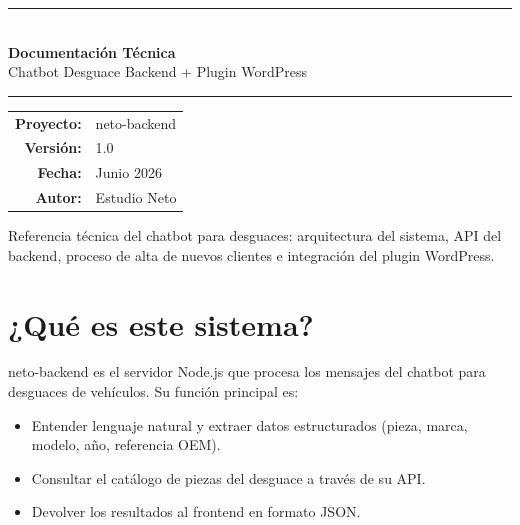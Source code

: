 \documentclass[12pt, a4paper]{article}
\begin{document}
\begin{titlepage}
\centering
\vspace*{3.5cm}

{\color{azulneto}\rule{\linewidth}{1.5pt}}\\[0.6em]
{\Huge\bfseries\color{azulneto} Documentación Técnica}\\[0.5em]
{\large\color{gray} Chatbot Desguace \textbullet{} Backend + Plugin WordPress}\\[0.4em]
{\color{azulneto}\rule{\linewidth}{1.5pt}}

\vspace{3.5cm}
\begin{tabular}{rl}
  \textbf{Proyecto:} & neto-backend \\[0.5em]
  \textbf{Versión:}  & 1.0 \\[0.5em]
  \textbf{Fecha:}    & Junio 2026 \\[0.5em]
  \textbf{Autor:}    & Estudio Neto \\
\end{tabular}

\vspace{3.5cm}
\begin{minipage}{0.78\linewidth}
\begin{tcolorbox}[colback=grisclaro, colframe=grismedio, fontupper=\small]
  \centering
  Referencia técnica del chatbot para desguaces: arquitectura del sistema,
  API del backend, proceso de alta de nuevos clientes e integración del plugin WordPress.
\end{tcolorbox}
\end{minipage}
\end{titlepage}

\tableofcontents
\newpage

\section{¿Qué es este sistema?}

neto-backend es el servidor Node.js que procesa los mensajes del chatbot para desguaces de vehículos. Su función principal es:

\begin{itemize}[noitemsep]
  \item Entender lenguaje natural y extraer datos estructurados (pieza, marca, modelo, año, referencia OEM).
  \item Consultar el catálogo de piezas del desguace a través de su API.
  \item Devolver los resultados al frontend en formato JSON.
\end{itemize}
\end{document}

